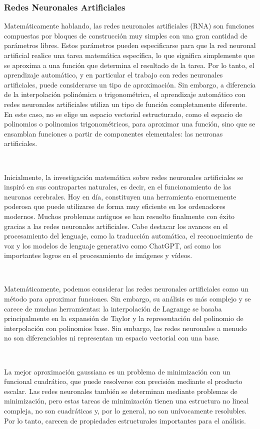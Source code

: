 \begin{frame}
  \frametitle{\bfseries\sffamily Redes Neuronales Artificiales}

  Matemáticamente hablando, las \alert{redes neuronales artificiales}
  (RNA) son funciones compuestas por bloques de construcción muy
  simples con una gran cantidad de parámetros libres.
  Estos parámetros pueden especificarse para que la red neuronal
  artificial realice una tarea matemática específica, lo que
  significa simplemente que se aproxima a una función que determina
  el resultado de la tarea.
  Por lo tanto, el \alert{aprendizaje automático}, y en particular el
  trabajo con redes neuronales artificiales, puede considerarse un
  tipo de aproximación.
  Sin embargo, a diferencia de la interpolación polinómica o
  trigonométrica, el \alert{aprendizaje automático} con
  \alert{redes neuronales artificiales} utiliza un tipo de función
  completamente diferente.
  En este caso, no se elige un espacio vectorial estructurado, como el
  espacio de polinomios o polinomios trigonométricos, para aproximar
  una función, sino que se ensamblan funciones a partir de componentes
  elementales: las neuronas artificiales.

  \pause

  \

  Inicialmente, la investigación matemática sobre redes neuronales
  artificiales se inspiró en sus contrapartes naturales, es decir, en
  el funcionamiento de las neuronas cerebrales.
  Hoy en día, constituyen una herramienta enormemente poderosa que
  puede utilizarse de forma muy eficiente en los ordenadores modernos.
  Muchos problemas antiguos se han resuelto finalmente con éxito
  gracias a las redes neuronales artificiales.
  Cabe destacar los avances en el procesamiento del lenguaje, como la
  traducción automática, el reconocimiento de voz y los modelos de
  lenguaje generativo como ChatGPT, así como los importantes logros
  en el procesamiento de imágenes y vídeos.

  \pause

  \

  Matemáticamente, podemos considerar las redes neuronales
  artificiales como un método para aproximar funciones.
  Sin embargo, su análisis es más complejo y se carece de muchas
  herramientas: la interpolación de Lagrange se basaba
  principalmente en la expansión de Taylor y la representación del
  polinomio de interpolación con polinomios base.
  Sin embargo, las redes neuronales a menudo no son diferenciables
  ni representan un espacio vectorial con una base.

  \pause

  \

  La mejor aproximación gaussiana es un problema de minimización con
  un funcional cuadrático, que puede resolverse con precisión
  mediante el producto escalar.
  Las redes neuronales también se determinan mediante problemas de
  minimización, pero estas tareas de minimización tienen una
  estructura no lineal compleja, no son cuadráticas y, por lo
  general, no son unívocamente resolubles.
  Por lo tanto, carecen de propiedades estructurales importantes
  para el análisis.
\end{frame}